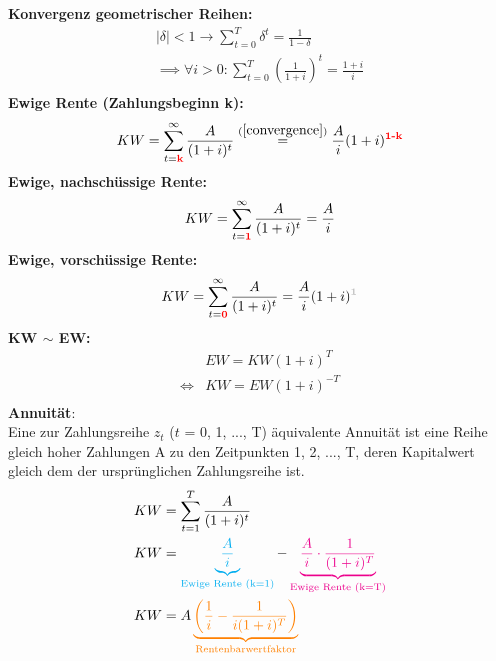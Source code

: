 \documentclass[leqno]{scrartcl}
\begin{document}
\begin{multicols}{3}
\textbf{Konvergenz geometrischer Reihen:}
  \begin{equation}\label{convergence}
    \begin{split}
    |\delta|<1 \rightarrow \sum^T_{t=0}\delta^t=\frac{1}{1-\delta}\\
    \implies \forall i > 0 : \sum^T_{t=0}\left(\frac{1}{1+i}\right)^t  = \frac{1+i}{i}\\
    \end{split}
  \end{equation}
\textbf{Ewige Rente (Zahlungsbeginn k):}
  \begin{equation}
    KW = \sum^{\infty}_{t=\color{red}{\textbf{k}}}\frac{A}{(1+i)^t} \overset{(\ref{convergence})}{=}\frac{A}{i}(1+i)^{\color{red}{\textbf{1-k}}}
  \end{equation}
\textbf{Ewige, nachschüssige Rente:}
  \begin{equation}
    KW = \sum^{\infty}_{t=\color{red}{\textbf{1}}}\frac{A}{(1+i)^t}=\frac{A}{i}
  \end{equation}
\textbf{Ewige, vorschüssige  Rente:}
  \begin{equation}
    KW = \sum^{\infty}_{t=\color{red}{\textbf{0}}}\frac{A}{(1+i)^t}=\frac{A}{i}(1+i)^{\color{lightgray}{\textbf{1}}}
  \end{equation}
\textbf{KW $\sim$ EW:}
  \begin{equation}\label{relation}
    \begin{split}
    &EW = KW (1+i)^{T}\\
    \iff &KW = EW (1+i)^{-T} \\
    \end{split}
  \end{equation}
\textbf{Annuität}:\\
  Eine zur Zahlungsreihe $z_t$ ($t$ = 0, 1, ..., T) äquivalente Annuität ist eine Reihe 
  gleich hoher Zahlungen A zu den Zeitpunkten 1, 2, ..., T, deren Kapitalwert 
  gleich dem der ursprünglichen Zahlungsreihe ist.
  \begin{equation*}
    \begin{split}
      KW &= \sum^T_{t=1}\frac{A}{(1+i)^t}\\
      KW &= \color{cyan}\underbrace{\frac{A}{i}}_\text{Ewige Rente (k=1)}
            \color{black}-
            \color{magenta}\underbrace{\frac{A}{i}\cdot\frac{1}{(1+i)^T}}_\text{Ewige Rente (k=T)}\\
      KW &= A\color{orange} \underbrace{\left(\frac{1}{i}-\frac{1}{i(1+i)^T}\right)}_\text{Rentenbarwertfaktor}\\

\end{split}
\end{equation*}
\end{multicols}
\end{document}
